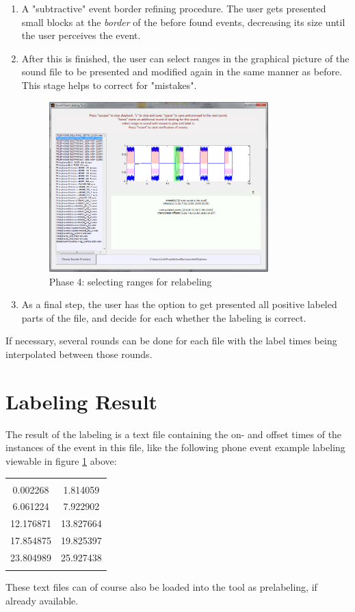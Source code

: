 \documentclass[%
paper=a4,
]
{scrartcl}
\begin{document}
\begin{enumerate}
\item A "subtractive" event border refining procedure. The user gets presented small blocks at the \emph{border} of the before found events, decreasing its size until the user perceives the event.
\item After this is finished, the user can select ranges in the graphical picture of the sound file to be presented and modified again in the same manner as before. This stage helps to correct for "mistakes".
\begin{figure}[h]
	\centering
  	\includegraphics[width=0.8\textwidth]{phase5.png}
	\caption{Phase 4: selecting ranges for relabeling}
	\label{fig:phase5}
\end{figure}

\item As a final step, the user has the option to get presented all positive labeled parts of the file, and decide for each whether the labeling is correct.
\end{enumerate}

If necessary, several rounds can be done for each file with the label times being interpolated between those rounds.

\section{Labeling Result}
The result of the labeling is a text file containing the on- and offset times of the instances of the event in this file, like the following phone event example labeling viewable in figure \ref{fig:phase5} above:\\
\begin{tabular}{cc}
 & \\
0.002268	& 1.814059 \\
6.061224 &	7.922902 \\
12.176871 &	13.827664 \\
17.854875	& 19.825397 \\
23.804989	& 25.927438 \\
 & \\
\end{tabular}

These text files can of course also be loaded into the tool as prelabeling, if already available.
\end{document}
